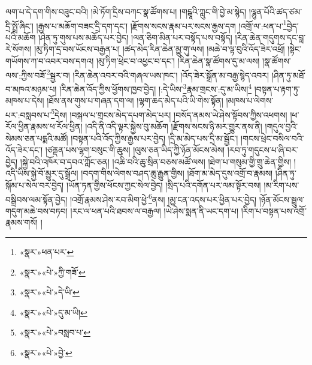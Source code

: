 ལག་པ་དེ་དག་གིས་བཟུང་བའི། །མེ་ཏོག་དྲིས་བཀང་སྣ་ཚོགས་པ། །གངྒཱའི་ཀླུང་གི་བྱེ་མ་སྙེད། །ལྷུན་པོའི་ཚད་ཙམ་དྲི་སྤྲོ་ཞིང་། །རྒྱས་པ་མཆོག་བཟང་དྲི་དག་དང་། །རྫོགས་སངས་རྣམ་པར་སངས་རྒྱས་དག །འགྲོ་ལ་:ཕན་པ་\footnote{«སྣར་»ཕན་པར་}བྱེད་པའི་མཆོག །ཤིན་ཏུ་གུས་པས་མཆོད་པར་བྱེད། །ལན་ཅིག་མིན་པར་བསྟོད་པས་བསྟོད། །རིན་ཆེན་གདུགས་དང་བླ་རེ་སོགས། །མུ་ཏིག་དྲ་བས་ཡོངས་བརྒྱན་པ། །ཚད་མེད་རིན་ཆེན་མྱུ་གུ་ལས། །མཆེ་བ་ལྟ་བུའི་འོད་ཟེར་འཕྲོ། །སྟེང་གཡོགས་ཀ་བ་འབར་བས་དགའ། །མུ་ཏིག་ཕྲེང་བ་འཕྱང་བ་དང་། །རིན་ཆེན་སྣ་ཚོགས་དུ་མ་ལས། །སྣ་ཚོགས་ལས་:ཀྱིས་བཟོ་\footnote{«སྣར་»«པེ་»ཀྱི་གཟོ་}སྦྱར་བ། །རིན་ཆེན་འབར་བའི་གཞལ་ཡས་ཁང་། །འོད་ཟེར་སྒྲོན་མ་བརྒྱ་སྙེད་འབར། །ཤིན་ཏུ་མཐོ་བ་མཁའ་མཉམ་པ། །རིན་ཆེན་འོད་ཀྱིས་ཕྱོགས་ཁྱབ་བྱེད། །:དེ་ཡིས་\footnote{«སྣར་»«པེ་»དེ་ཡི་}རྣམ་གྲངས་:དུ་མ་ཡིས།\footnote{«སྣར་»«པེ་»དུ་མ་ཡི།} །བསྟན་པ་རྟག་ཏུ་མཁས་པ་དེས། །ཐོས་ནས་གུས་པ་གཞན་དག་ལ། །ལྷག་ཆད་མེད་པའི་ཡི་གེས་སྟོན། །མཁས་པ་ལེགས་པར་:བསླབས་པ་\footnote{«སྣར་»«པེ་»བསླབ་པ་}དེས། །བསྐལ་པ་གྲངས་མེད་དཔག་མེད་པར། །བསོད་ནམས་ཡེ་ཤེས་སྟོབས་ཀྱིས་འཕགས། །ཕ་རོལ་ཕྱིན་རྣམས་ཕ་རོལ་ཕྱིན། །འདི་ནི་འདི་ལྟར་སྐྱེས་བུ་མཆོག །རྫོགས་སངས་ཉི་མར་གྱུར་ནས་ནི། །གདུལ་བྱའི་སེམས་ཅན་པདྨའི་མཚོ། །བསྟན་པའི་འོད་ཀྱིས་རྒྱས་པར་བྱེད། །དྲི་མ་མེད་པས་དྲི་མ་སྦྱོང་། །གངས་ཕྲེང་བསིལ་བའི་འོད་ཟེར་དང་། །ཙནྡན་པས་ལྷག་བསུང་གི་ཆུས། །ལུས་ཅན་ཡིད་ཀྱི་ཉོན་མོངས་མེས། །རབ་ཏུ་གདུངས་པ་ཞི་བར་བྱེད། །སྐྱེ་བའི་འཁོར་བ་དབའ་ཀློང་ཅན། །འཆི་བའི་ཆུ་སྲིན་བཅས་མཚོ་ལས། །ཐེག་པ་གསུམ་གྱི་གྲུ་ཆེན་གྱིས། །འདི་ཡིས་སྐྱེ་བོ་མྱུར་དུ་སྒྲོལ། །བདག་གིས་ལེགས་བཤད་ཆུ་རྒྱུན་གྱིས། །ཐོག་མ་མེད་དུས་འགྲོ་བ་རྣམས། །ཤིན་ཏུ་སྐོམ་པ་སེལ་བར་བྱེད། །ཡོན་ཏན་གྱིས་ཕོངས་ཀྱང་སེལ་བྱེད། །སྲིད་པའི་དགོན་པར་ལམ་སྟོར་བས། །མ་རིག་པས་བསྒྲིབས་ལམ་སྟོན་བྱེད། །འགྲོ་རྣམས་ཤེས་རབ་མིག་ཕྱེ་\footnote{«སྣར་»«པེ་»བྱེ་}ནས། །མྱ་ངན་འདས་པར་ཕྱིན་པར་བྱེད། །ཉོན་མོངས་སྦྲུལ་གདུག་མཆེ་བས་བཏབ། །རང་ལ་ཕན་པའི་ཐབས་ལ་བརྒྱལ། །ཡེ་ཤེས་སྨན་ནི་ཡང་དག་པ། །རིག་པ་བསྟན་པས་འགྲོ་རྣམས་གསོ། །
